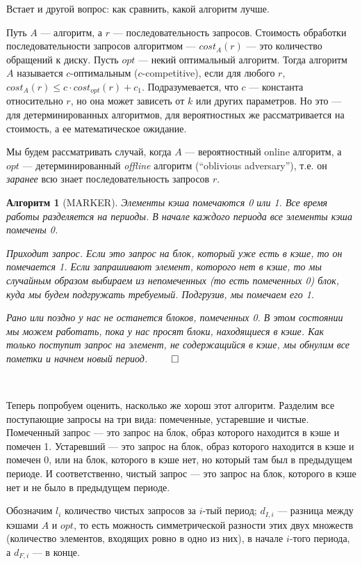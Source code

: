 \documentclass[a4paper]{article}
\theoremstyle{indented}
\newtheorem{alg}{Алгоритм}
\theoremstyle{definition}
\theoremstyle{remark}
\begin{document}
Встает и другой вопрос: как сравнить, какой алгоритм лучше.

\newcommand{\cost}{\textit{cost}}
Путь $A$ --- алгоритм, а $r$ --- последовательность запросов. 
Стоимость обработки последовательности запросов алгоритмом
--- ${\cost}_A(r)$ --- это количество обращений к диску. 
Пусть $opt$ --- некий оптимальный алгоритм. 
Тогда алгоритм $A$ называется $c$-оптимальным ($c$-competitive), 
если для любого $r$, ${\cost}_A(r) \le c \cdot {\cost}_{opt}(r) + c_1$. 
Подразумевается, что $c$ --- константа относительно $r$, 
но она может зависеть от $k$ или других параметров.
Но это --- для детерминированных алгоритмов, для вероятностных же 
рассматривается на стоимость, а ее математическое ожидание.

Мы будем рассматривать случай, когда $A$ --- вероятностный online алгоритм, 
а $opt$ --- детерминированный \emph{offline} алгоритм (``oblivious adversary''),
т.е. он \emph{заранее} всю знает последовательность запросов $r$.
\\ 

\begin{alg}[MARKER]
Элементы кэша помечаются 0 или 1.
Все время работы разделяется на периоды. 
В начале каждого периода все элементы кэша помечены 0.

Приходит запрос. Если это запрос на блок, который уже есть в кэше, 
то он помечается 1. Если запрашивают элемент, которого нет в кэше, 
то мы случайным образом выбираем из непомеченных (то есть помеченных 0) блок, 
куда мы будем подгружать требуемый. Подгрузив, мы помечаем его 1.

Рано или поздно у нас не останется блоков, помеченных 0. 
В этом состоянии мы можем работать, пока у нас просят блоки,
находящиеся в кэше. Как только поступит запрос на элемент, 
не содержащийся в кэше, мы обнулим все пометки и начнем новый период. 
\hfill$\qed$
\end{alg} \

Теперь попробуем оценить, насколько же хорош этот алгоритм. 
Разделим все поступающие запросы на три вида: помеченные, устаревшие и чистые.
Помеченный запрос --- это запрос на блок, образ которого находится в кэше 
и помечен 1. Устаревший --- это запрос на блок, образ которого находится 
в кэше и помечен 0, или на блок, которого в кэше нет, но который там был 
в предыдущем периоде. И соответственно, чистый запрос --- это запрос на блок, 
которого в кэше нет и не было в предыдущем периоде.

Обозначим $l_i$ количество чистых запросов за $i$-тый период; 
$d_{I,i}$ --- разница между кэшами $A$ и $opt$, 
то есть можность симметрической разности этих двух множеств
(количество элементов, входящих ровно в одно из них), 
в начале $i$-того периода, 
а $d_{F,i}$ --- в конце.
\end{document}
